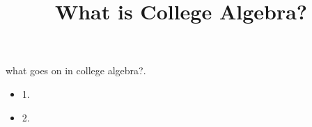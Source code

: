 \documentclass{ximera}
\title{What is College Algebra?}
\begin{document}
\begin{abstract}
\end{abstract}

\maketitle

\begin{sectionOutcomes}

what goes on in college algebra?. 

\begin{itemize}
\item 1.
\item 2.
\end{itemize}

\end{sectionOutcomes}
\end{document}
